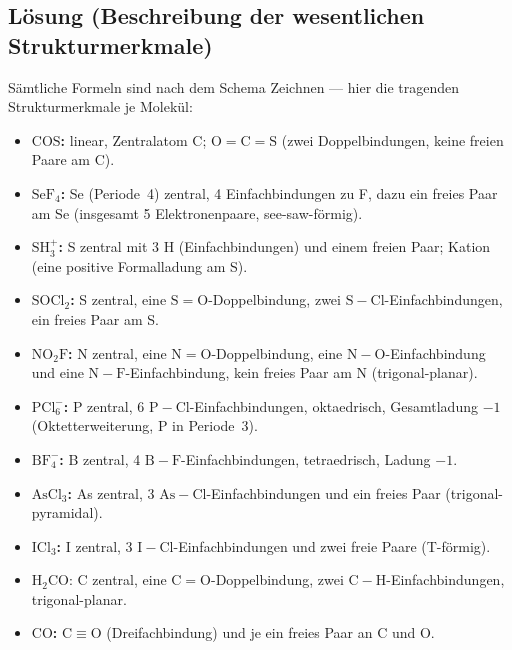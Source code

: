 
\subsection*{Lösung (Beschreibung der wesentlichen Strukturmerkmale)}
Sämtliche Formeln sind nach dem Schema Zeichnen --- hier die tragenden
Strukturmerkmale je Molekül:

\begin{itemize}
  \item \textbf{$\mathrm{COS}$:} linear, Zentralatom C; $\mathrm{O=C=S}$
        (zwei Doppelbindungen, keine freien Paare am C).
  \item \textbf{$\mathrm{SeF_4}$:} Se (Periode~4) zentral, 4 Einfachbindungen zu
        F, dazu ein freies Paar am Se (insgesamt 5 Elektronenpaare,
        see-saw-förmig).
  \item \textbf{$\mathrm{SH_3^+}$:} S zentral mit 3 H (Einfachbindungen) und
        einem freien Paar; Kation (eine positive Formalladung am S).
  \item \textbf{$\mathrm{SOCl_2}$:} S zentral, eine $\mathrm{S=O}$-Doppelbindung,
        zwei $\mathrm{S-Cl}$-Einfachbindungen, ein freies Paar am S.
  \item \textbf{$\mathrm{NO_2F}$:} N zentral, eine $\mathrm{N=O}$-Doppelbindung,
        eine $\mathrm{N-O}$-Einfachbindung und eine $\mathrm{N-F}$-Einfachbindung,
        kein freies Paar am N (trigonal-planar).
  \item \textbf{$\mathrm{PCl_6^-}$:} P zentral, 6 $\mathrm{P-Cl}$-Einfachbindungen,
        oktaedrisch, Gesamtladung $-1$ (Oktetterweiterung, P in Periode~3).
  \item \textbf{$\mathrm{BF_4^-}$:} B zentral, 4 $\mathrm{B-F}$-Einfachbindungen,
        tetraedrisch, Ladung $-1$.
  \item \textbf{$\mathrm{AsCl_3}$:} As zentral, 3 $\mathrm{As-Cl}$-Einfachbindungen
        und ein freies Paar (trigonal-pyramidal).
  \item \textbf{$\mathrm{ICl_3}$:} I zentral, 3 $\mathrm{I-Cl}$-Einfachbindungen
        und zwei freie Paare (T-förmig).
  \item \textbf{$\mathrm{H_2CO}$}: C zentral, eine $\mathrm{C=O}$-Doppelbindung,
        zwei $\mathrm{C-H}$-Einfachbindungen, trigonal-planar.
  \item \textbf{$\mathrm{CO}$:} $\mathrm{C\equiv O}$ (Dreifachbindung) und je ein
        freies Paar an C und O.
\end{itemize}

